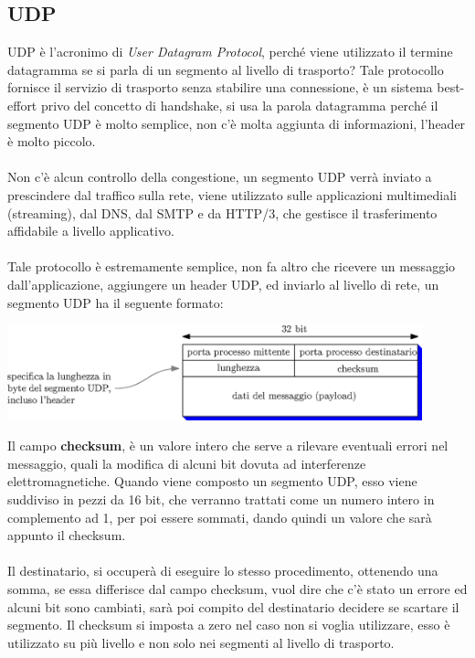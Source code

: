\documentclass[12pt, letterpaper]{article}
\newcommand{\acc}{\\\hphantom{}\\}
\begin{document}
\subsection{UDP}
UDP è l'acronimo di \textit{User Datagram Protocol}, perché viene utilizzato il termine datagramma se si
parla di un segmento al livello di trasporto? Tale protocollo fornisce il servizio di trasporto senza
stabilire una connessione, è un sistema best-effort privo del concetto di handshake, si usa la parola datagramma
perché il segmento UDP è molto semplice, non c'è molta aggiunta di informazioni, l'header è molto piccolo.
\acc
Non c'è alcun controllo della congestione, un segmento UDP verrà inviato a prescindere dal traffico sulla
rete, viene utilizzato sulle applicazioni multimediali (streaming), dal DNS, dal SMTP e da HTTP/3, che
gestisce il trasferimento affidabile a livello applicativo. \acc
Tale protocollo è estremamente semplice, non fa altro che ricevere un messaggio dall'applicazione, aggiungere
un header UDP, ed inviarlo al livello di rete, un segmento UDP ha il seguente formato:\begin{center}
    \includegraphics[width=0.9\textwidth ]{images/segmentoUDP.eps}
\end{center}
Il campo \textbf{checksum}, è un valore intero che serve a rilevare eventuali errori nel messaggio, quali
la modifica di alcuni bit dovuta ad interferenze elettromagnetiche. Quando viene composto un
segmento UDP, esso viene suddiviso in pezzi da 16 bit, che verranno trattati come un numero
intero in complemento ad 1, per poi essere sommati, dando quindi un valore che sarà appunto
il checksum.\acc
Il destinatario, si occuperà di eseguire lo stesso procedimento, ottenendo una somma, se essa differisce
dal campo checksum, vuol dire che c'è stato un errore ed alcuni bit sono cambiati, sarà poi compito
del destinatario decidere se scartare il segmento. Il checksum si imposta a zero nel caso non
si voglia utilizzare, esso è utilizzato su più livello e non solo nei segmenti al livello di trasporto.
\end{document}
